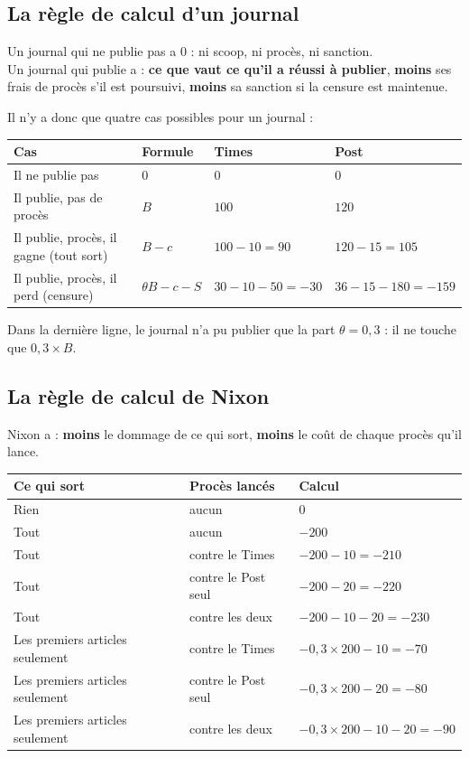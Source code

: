\documentclass[11pt,a4paper]{article}
\theoremstyle{definition}
\begin{document}
\subsection{La règle de calcul d'un journal}
\begin{simple}
Un journal qui ne publie pas a $0$ : ni scoop, ni procès, ni sanction.\\
Un journal qui publie a : \textbf{ce que vaut ce qu'il a réussi à publier}, \textbf{moins} ses frais de procès s'il est poursuivi, \textbf{moins} sa sanction si la censure est maintenue.
\end{simple}
Il n'y a donc que quatre cas possibles pour un journal :
\begin{center}
\small
\begin{tabular}{@{}llll@{}}
\toprule
Cas & Formule & Times & Post \\
\midrule
Il ne publie pas & $0$ & $0$ & $0$ \\
Il publie, pas de procès & $B$ & $100$ & $120$ \\
Il publie, procès, il gagne (tout sort) & $B-c$ & $100-10=90$ & $120-15=105$ \\
Il publie, procès, il perd (censure) & $\theta B-c-S$ & $30-10-50=-30$ & $36-15-180=-159$ \\
\bottomrule
\end{tabular}
\end{center}
Dans la dernière ligne, le journal n'a pu publier que la part $\theta=0,3$ : il ne touche que $0,3\times B$.

\subsection{La règle de calcul de Nixon}
\begin{simple}
Nixon a : \textbf{moins} le dommage de ce qui sort, \textbf{moins} le coût de chaque procès qu'il lance.
\end{simple}
\begin{center}
\small
\begin{tabular}{@{}lll@{}}
\toprule
Ce qui sort & Procès lancés & Calcul \\
\midrule
Rien & aucun & $0$ \\
Tout & aucun & $-200$ \\
Tout & contre le Times & $-200-10=-210$ \\
Tout & contre le Post seul & $-200-20=-220$ \\
Tout & contre les deux & $-200-10-20=-230$ \\
Les premiers articles seulement & contre le Times & $-0,3\times200-10=-70$ \\
Les premiers articles seulement & contre le Post seul & $-0,3\times200-20=-80$ \\
Les premiers articles seulement & contre les deux & $-0,3\times200-10-20=-90$ \\
\bottomrule
\end{tabular}
\end{center}
\end{document}
